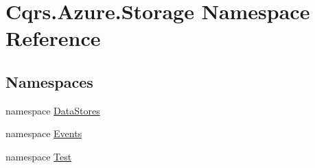 \hypertarget{namespaceCqrs_1_1Azure_1_1Storage}{}\section{Cqrs.\+Azure.\+Storage Namespace Reference}
\label{namespaceCqrs_1_1Azure_1_1Storage}
\subsection*{Namespaces}
\begin{DoxyCompactItemize}
\item 
namespace \hyperlink{namespaceCqrs_1_1Azure_1_1Storage_1_1DataStores}{Data\+Stores}
\item 
namespace \hyperlink{namespaceCqrs_1_1Azure_1_1Storage_1_1Events}{Events}
\item 
namespace \hyperlink{namespaceCqrs_1_1Azure_1_1Storage_1_1Test}{Test}
\end{DoxyCompactItemize}

